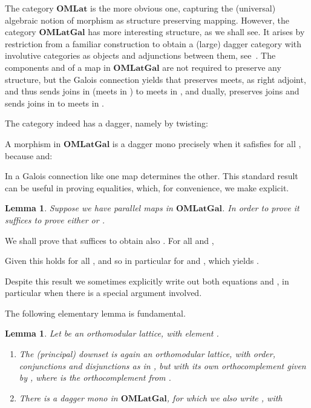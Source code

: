 \documentclass{article}
\newtheorem{lemma}[theorem]{Lemma}
\newenvironment{proof}[1][Proof]{ \begin{trivlist}\item[\hskip \labelsep {\bfseries #1}]}{ \end{trivlist}}
\newcommand{\QED}{\hspace*{\fill}}
\newcommand{\Cat}[1]{\ensuremath{\mathbf{#1}}}
\begin{document}
The category \Cat{OMLat} is the more obvious one, capturing the
(universal) algebraic notion of morphism as structure preserving
mapping. However, the category \Cat{OMLatGal} has more interesting
structure, as we shall see. It arises by restriction from a familiar
construction to obtain a (large) dagger category with involutive
categories as objects and adjunctions between them,
see~\cite{Heunen09}. The components 
and  of a map 
in \Cat{OMLatGal} are not required to preserve any structure, but the
Galois connection yields that  preserves meets, as right
adjoint, and thus sends joins in  (meets in ) to meets in
, and dually,  preserves joins and sends joins in  to
meets in . 

The category  indeed has a dagger, namely by twisting:


\noindent A morphism  in \Cat{OMLatGal} is a
dagger mono precisely when it safisfies 
for all , because  and:



In a Galois connection like  one map determines
the other. This standard result can be useful in proving equalities,
which, for convenience, we make explicit.


\begin{lemma}
\label{MapEqLem}
Suppose we have parallel maps  in
\Cat{OMLatGal}. In order to prove  it suffices to prove either
 or .
\end{lemma}


\begin{proof}
We shall prove that  suffices to obtain also 
. For all  and ,


\noindent Given  this holds for all , and so in particular for
 and , which yields . \QED
\end{proof}


Despite this result we sometimes explicitly write out both equations
 and , in particular when there is a special
argument involved.

The following elementary lemma is fundamental.


\begin{lemma}
\label{DownsetLem}
Let  be an orthomodular lattice, with element . 
\begin{enumerate}
\item The (principal) downset  is
  again an orthomodular lattice, with order, conjunctions and
  disjunctions as in , but with its own orthocomplement  given
  by , where  is the
  orthocomplement from .

\item There is a dagger mono  in
  \Cat{OMLatGal}, for which we also write , with

\end{enumerate}
\end{lemma}
\end{document}
